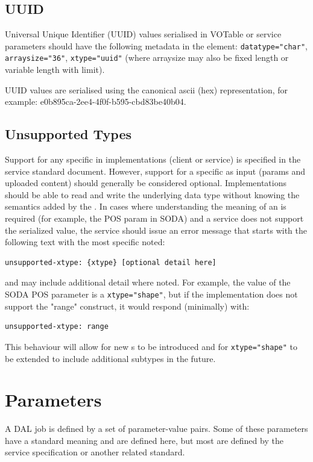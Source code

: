 \documentclass[11pt,letter]{ivoa}
\begin{document}
\subsection{UUID}
Universal Unique Identifier (UUID) values serialised in VOTable or service parameters 
should have the following metadata in the  element: \verb|datatype="char"|, 
\verb|arraysize="36"|, \verb|xtype="uuid"| (where arraysize may also be fixed length or 
variable length with limit).

UUID values \citep{std:RFC4122} are serialised using the canonical ascii (hex) 
representation, for example: e0b895ca-2ee4-4f0f-b595-cbd83be40b04.

\subsection{Unsupported Types}

Support for any specific  in implementations (client or service) is specified in
the service standard document. However, support for a specific  as input (params
and uploaded content) should generally be considered optional. Implementations should 
be able to read and write the underlying data type without knowing the semantics added 
by the . In cases where understanding the meaning of an  is required (for 
example, the POS param in SODA) and a service does not support the serialized value, 
the service should issue an error message that starts with the following text with the 
most specific  noted:
\begin{verbatim}
unsupported-xtype: {xtype} [optional detail here]
\end{verbatim}
and may include additional detail where noted. For example, the value of the SODA POS parameter
is a \verb|xtype="shape"|, but if the implementation does not support the "range" construct, it 
would respond (minimally) with:
\begin{verbatim}
unsupported-xtype: range
\end{verbatim}
This behaviour will allow for new s to be introduced and for \verb|xtype="shape"| 
to be extended to include additional subtypes in the future.

\section{Parameters}
\label{sec:parameters}
A DAL job is defined by a set of parameter-value pairs. Some of these parameters
have a standard meaning and are defined here, but most are defined by the
service specification or another related standard.
\end{document}
